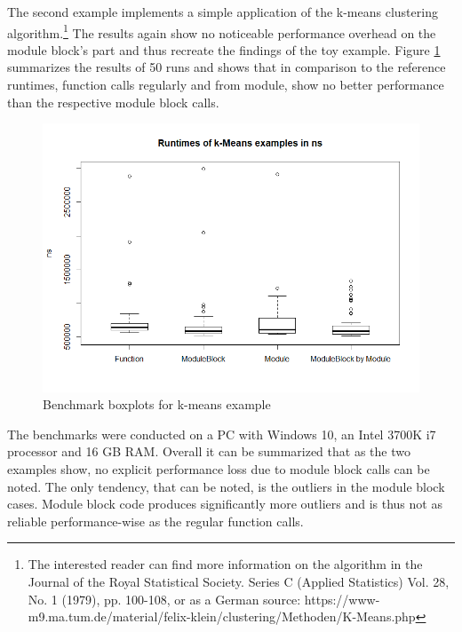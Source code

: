 The second example implements a simple application of the k-means clustering algorithm.\footnote{The interested reader can find more information on the algorithm in the Journal of the Royal Statistical Society. Series C (Applied Statistics) Vol. 28, No. 1 (1979), pp. 100-108, or as a German source:  https://www-m9.ma.tum.de/material/felix-klein/clustering/Methoden/K-Means.php} The results again show no noticeable performance overhead on the module block's part and thus recreate the findings of the toy example. Figure \ref{fig:bKMeans} summarizes the results of 50 runs and shows that in comparison to the reference runtimes, function calls regularly and from module, show no better performance than the respective module block calls.

\begin{figure}[h!]
    \centering
    \includegraphics[scale=0.7]{figures/runtimesKMeansBoxplot.png}
    \caption{Benchmark boxplots for k-means example}
    \label{fig:bKMeans}
\end{figure}

The benchmarks were conducted on a PC with Windows 10, an Intel 3700K i7 processor and 16 GB RAM. Overall it can be summarized that as the two examples show, no explicit performance loss due to module block calls can be noted. The only tendency, that can be noted, is the outliers in the module block cases. Module block code produces significantly more outliers and is thus not as reliable performance-wise as the regular function calls. 